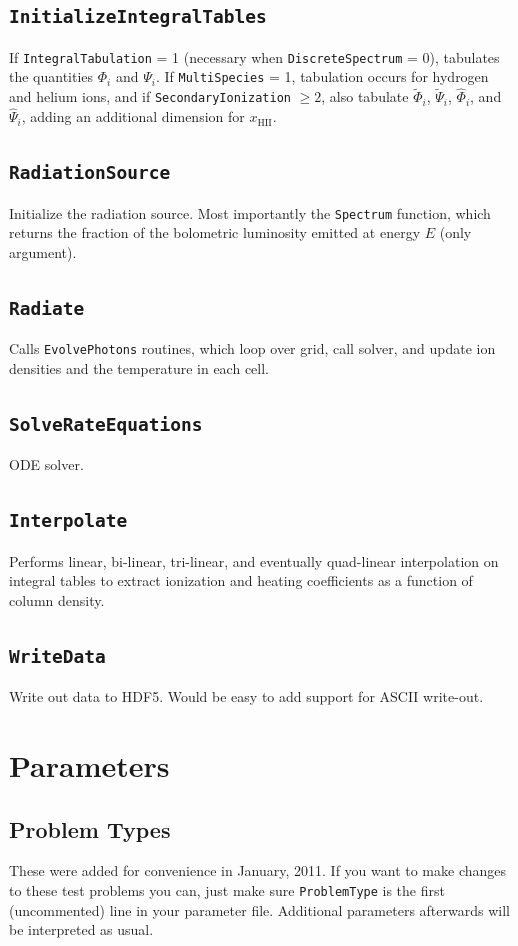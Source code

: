 \documentclass[letterpaper,titlepage,12pt]{article}
\numberwithin{equation}{section}
\begin{document}
\subsection{\texttt{InitializeIntegralTables}}
If \texttt{IntegralTabulation} = 1 (necessary when \texttt{DiscreteSpectrum} = 0), tabulates the quantities $\Phi_i$ and $\Psi_i$.  If \texttt{MultiSpecies} = 1, tabulation occurs for hydrogen and helium ions, and if \texttt{SecondaryIonization} $\ge 2$, also tabulate $\widetilde{\Phi}_i$, $\widetilde{\Psi}_i$, $\widehat{\Phi}_i$, and $\widehat{\Psi}_i$, adding an additional dimension for $x_{\mathrm{HII}}$.
\subsection{\texttt{RadiationSource}}
Initialize the radiation source.  Most importantly the \texttt{Spectrum} function, which returns the fraction of the bolometric luminosity emitted at energy $E$ (only argument).
\subsection{\texttt{Radiate}}
Calls \texttt{EvolvePhotons} routines, which loop over grid, call solver, and update ion densities and the temperature in each cell.
\subsection{\texttt{SolveRateEquations}}
ODE solver.
\subsection{\texttt{Interpolate}}
Performs linear, bi-linear, tri-linear, and eventually quad-linear interpolation on integral tables to extract ionization and heating coefficients as a function of column density.
\subsection{\texttt{WriteData}}
Write out data to HDF5.  Would be easy to add support for ASCII write-out.

\section{Parameters} \label{sec:Parameters}

\subsection{Problem Types}
These were added for convenience in January, 2011.  If you want to make changes to these test problems you can, just make sure \texttt{ProblemType} is the first (uncommented) line in your parameter file.  Additional parameters afterwards will be interpreted as usual.
\end{document}
